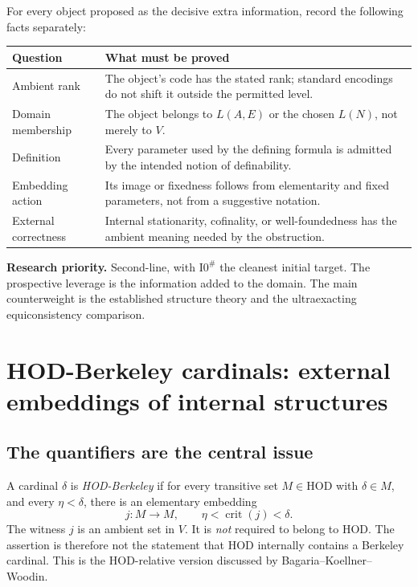 \documentclass[11pt,letterpaper]{article}
\theoremstyle{definition}
\newcommand{\HOD}{\mathrm{HOD}}
\newcommand{\crit}{\operatorname{crit}}
\newcommand{\Isharp}{\mathrm{I0}^{\#}}
\newcommand{\Priority}[1]{\textbf{Research priority.} #1}
\begin{document}
For every object proposed as the decisive extra information, record the following facts separately:
\begin{center}
\renewcommand{\arraystretch}{1.12}
\begin{tabularx}{\textwidth}{@{}P{.23\textwidth}Y@{}}
\toprule
\textbf{Question}&\textbf{What must be proved}\\\midrule
Ambient rank & The object's code has the stated rank; standard encodings do not shift it outside the permitted level.\\
Domain membership & The object belongs to $L(A,E)$ or the chosen $L(N)$, not merely to $V$.\\
Definition & Every parameter used by the defining formula is admitted by the intended notion of definability.\\
Embedding action & Its image or fixedness follows from elementarity and fixed parameters, not from a suggestive notation.\\
External correctness & Internal stationarity, cofinality, or well-foundedness has the ambient meaning needed by the obstruction.\\
\bottomrule
\end{tabularx}
\end{center}

\Priority{Second-line, with $\Isharp$ the cleanest initial target. The prospective leverage is the information added to the domain. The main counterweight is the established structure theory and the ultraexacting equiconsistency comparison.}

\section{HOD-Berkeley cardinals: external embeddings of internal structures}\label{sec:hodberkeley}

\subsection{The quantifiers are the central issue}

A cardinal $\delta$ is \emph{HOD-Berkeley} if for every transitive set $M\in\HOD$ with $\delta\in M$, and every $\eta<\delta$, there is an elementary embedding
\begin{equation}
 j:M\longrightarrow M,
 \qquad \eta<\crit(j)<\delta.
 \label{eq:hodberkeley}
\end{equation}
The witness $j$ is an ambient set in $V$. It is \emph{not} required to belong to HOD. The assertion is therefore not the statement that HOD internally contains a Berkeley cardinal. This is the HOD-relative version discussed by Bagaria--Koellner--Woodin. \cite[Section~8.2]{bkw}
\end{document}

